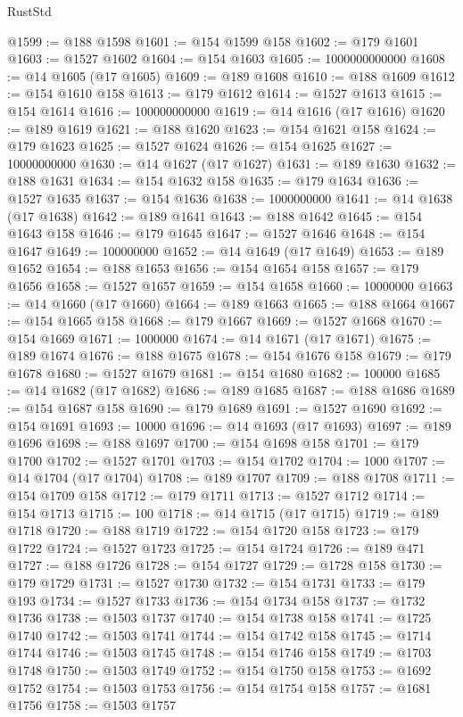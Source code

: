 \begin{lexlean}{RustStd}
\begin{coremodule}
@1599 := @188 @1598
@1601 := @154 @1599 @158
@1602 := @179 @1601
@1603 := @1527 @1602
@1604 := @154 @1603
@1605 := 1000000000000
@1608 := @14 @1605 (@17 @1605)
@1609 := @189 @1608
@1610 := @188 @1609
@1612 := @154 @1610 @158
@1613 := @179 @1612
@1614 := @1527 @1613
@1615 := @154 @1614
@1616 := 100000000000
@1619 := @14 @1616 (@17 @1616)
@1620 := @189 @1619
@1621 := @188 @1620
@1623 := @154 @1621 @158
@1624 := @179 @1623
@1625 := @1527 @1624
@1626 := @154 @1625
@1627 := 10000000000
@1630 := @14 @1627 (@17 @1627)
@1631 := @189 @1630
@1632 := @188 @1631
@1634 := @154 @1632 @158
@1635 := @179 @1634
@1636 := @1527 @1635
@1637 := @154 @1636
@1638 := 1000000000
@1641 := @14 @1638 (@17 @1638)
@1642 := @189 @1641
@1643 := @188 @1642
@1645 := @154 @1643 @158
@1646 := @179 @1645
@1647 := @1527 @1646
@1648 := @154 @1647
@1649 := 100000000
@1652 := @14 @1649 (@17 @1649)
@1653 := @189 @1652
@1654 := @188 @1653
@1656 := @154 @1654 @158
@1657 := @179 @1656
@1658 := @1527 @1657
@1659 := @154 @1658
@1660 := 10000000
@1663 := @14 @1660 (@17 @1660)
@1664 := @189 @1663
@1665 := @188 @1664
@1667 := @154 @1665 @158
@1668 := @179 @1667
@1669 := @1527 @1668
@1670 := @154 @1669
@1671 := 1000000
@1674 := @14 @1671 (@17 @1671)
@1675 := @189 @1674
@1676 := @188 @1675
@1678 := @154 @1676 @158
@1679 := @179 @1678
@1680 := @1527 @1679
@1681 := @154 @1680
@1682 := 100000
@1685 := @14 @1682 (@17 @1682)
@1686 := @189 @1685
@1687 := @188 @1686
@1689 := @154 @1687 @158
@1690 := @179 @1689
@1691 := @1527 @1690
@1692 := @154 @1691
@1693 := 10000
@1696 := @14 @1693 (@17 @1693)
@1697 := @189 @1696
@1698 := @188 @1697
@1700 := @154 @1698 @158
@1701 := @179 @1700
@1702 := @1527 @1701
@1703 := @154 @1702
@1704 := 1000
@1707 := @14 @1704 (@17 @1704)
@1708 := @189 @1707
@1709 := @188 @1708
@1711 := @154 @1709 @158
@1712 := @179 @1711
@1713 := @1527 @1712
@1714 := @154 @1713
@1715 := 100
@1718 := @14 @1715 (@17 @1715)
@1719 := @189 @1718
@1720 := @188 @1719
@1722 := @154 @1720 @158
@1723 := @179 @1722
@1724 := @1527 @1723
@1725 := @154 @1724
@1726 := @189 @471
@1727 := @188 @1726
@1728 := @154 @1727
@1729 := @1728 @158
@1730 := @179 @1729
@1731 := @1527 @1730
@1732 := @154 @1731
@1733 := @179 @193
@1734 := @1527 @1733
@1736 := @154 @1734 @158
@1737 := @1732 @1736
@1738 := @1503 @1737
@1740 := @154 @1738 @158
@1741 := @1725 @1740
@1742 := @1503 @1741
@1744 := @154 @1742 @158
@1745 := @1714 @1744
@1746 := @1503 @1745
@1748 := @154 @1746 @158
@1749 := @1703 @1748
@1750 := @1503 @1749
@1752 := @154 @1750 @158
@1753 := @1692 @1752
@1754 := @1503 @1753
@1756 := @154 @1754 @158
@1757 := @1681 @1756
@1758 := @1503 @1757

\end{coremodule}
\end{lexlean}
